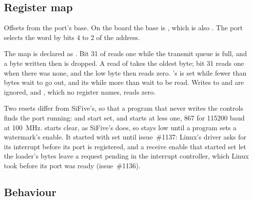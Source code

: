 \subsection*{Register map}

Offsets from the port's base. On the board the base is ,
which is also . The port selects the word by
bits 4 to 2 of the address.


The map is declared as . Bit 31 of  reads
one while the transmit queue is full, and a byte written then is
dropped. A read of  takes the oldest byte; bit 31 reads
one when there was none, and the low byte then reads zero. 's
 is set while fewer than  bytes wait to go
out, and its  while more than  wait to be read.
Writes to  and  are ignored, and ,
which no register names, reads zero.

Two resets differ from SiFive's, so that a program that never writes
the controls finds the port running:  and 
start set, and  starts at  less one, 867 for
115200 baud at 100~MHz.  starts clear, as SiFive's does, so
 stays low until a program sets a watermark's enable. It
started with  set until issue~\#1137: Linux's driver asks
for its interrupt before its port is registered, and a receive enable
that started set let the loader's bytes leave a request pending in the
interrupt controller, which Linux took before its port was ready
(issue~\#1136).


\subsection*{Behaviour}

